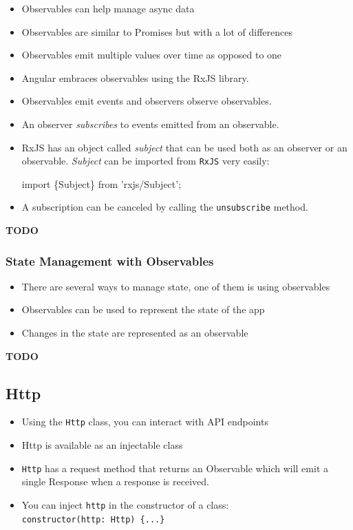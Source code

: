 \documentclass[12pt,]{article}
\newenvironment{Shaded}{}{}
\newcommand{\KeywordTok}[1]{\textcolor[rgb]{0.00,0.00,1.00}{{#1}}}
\providecommand{\tightlist}{%
  \setlength{\itemsep}{0pt}\setlength{\parskip}{0pt}}
\begin{document}
\begin{itemize}
\item
  Observables can help manage async data
\item
  Observables are similar to Promises but with a lot of differences
\item
  Observables emit multiple values over time as opposed to one
\item
  Angular embraces observables using the RxJS library.
\item
  Observables emit events and observers observe observables.
\item
  An observer \emph{subscribes} to events emitted from an observable.
\item
  RxJS has an object called \emph{subject} that can be used both as an
  observer or an observable. \emph{Subject} can be imported from
  \texttt{RxJS} very easily:

\begin{Shaded}
\begin{Highlighting}[numbers=left,,]
\KeywordTok{import \{Subject\} from 'rxjs/Subject';}
\end{Highlighting}
\end{Shaded}
\item
  A subscription can be canceled by calling the \texttt{unsubscribe}
  method.
\end{itemize}

\textbf{TODO}

\subsubsection{State Management with
Observables}\label{state-management-with-observables}

\begin{itemize}
\tightlist
\item
  There are several ways to manage state, one of them is using
  observables
\item
  Observables can be used to represent the state of the app
\item
  Changes in the state are represented as an observable
\end{itemize}

\textbf{TODO}

\subsection{Http}\label{http}

\begin{itemize}
\tightlist
\item
  Using the \texttt{Http} class, you can interact with API endpoints
\item
  Http is available as an injectable class
\item
  \texttt{Http} has a request method that returns an Observable which
  will emit a single Response when a response is received.
\item
  You can inject \texttt{http} in the constructor of a class:
  \texttt{constructor(http:\ Http)\ \{...\}}
\end{itemize}
\end{document}
